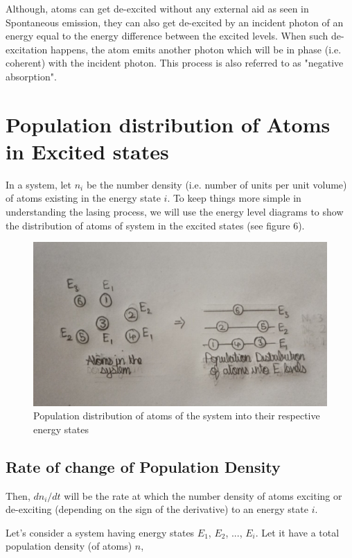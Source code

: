 \documentclass[12pt]{article}
\begin{document}
Although, atoms can get de-excited without any external aid as seen in Spontaneous emission, they can also get de-excited by an incident photon of an energy equal to the energy difference between the excited levels. When such de-excitation happens, the atom emits another photon which will be in phase (i.e. coherent) with the incident photon. This process is also referred to as "negative absorption".

\section{Population distribution of Atoms in Excited states}

In a system, let $n_{i}$ be the number density (i.e. number of units per unit volume) of atoms existing in the energy state $i$. To keep things more simple in understanding the lasing process, we will use the energy level diagrams to show the distribution of atoms of system in the excited states (see figure 6).

\begin{figure}[H]
    \centering
    \includegraphics[scale=.5]{./img/06_population_dist.png}
    \caption{Population distribution of atoms of the system into their respective energy states}
\end{figure}

\subsection{Rate of change of Population Density}

Then, $dn_{i}/dt$ will be the rate at which the number density of atoms exciting or de-exciting (depending on the sign of the derivative) to an energy state $i$. 

Let's consider a system having energy states $E_{1}$, $E_{2}$, ..., $E_{i}$. Let it have a total population density (of atoms) $n$,
\end{document}
